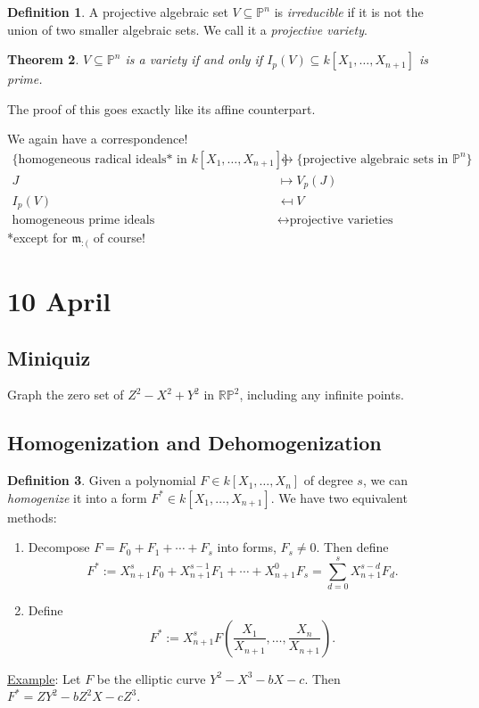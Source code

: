 \documentclass[12pt]{article}
\newcommand{\ita}[1]{\textit{#1}}
\newtheorem{theorem}{Theorem}[section]
\theoremstyle{definition}
\newtheorem{definition}[theorem]{Definition}
\begin{document}
\begin{definition}
    A projective algebraic set $V\subseteq\mathbb{P}^n$ is \ita{irreducible} if it is not the union of two smaller algebraic sets. We call it a \ita{projective variety}.
\end{definition}
\begin{theorem}
    $V\subseteq\mathbb{P}^n$ is a variety if and only if $I_p(V)\subseteq k[X_1,\dotsc,X_{n+1}]$ is prime.
\end{theorem}
The proof of this goes exactly like its affine counterpart.

We again have a correspondence!
\begin{equation}
    \begin{split}
        \{\text{homogeneous radical ideals* in }k[X_1,\dotsc,X_{n+1}]\}&\longleftrightarrow\{\text{projective algebraic sets in }\mathbb{P}^n\}\\
        J&\mapsto V_p(J)\\
        I_p(V)&\mapsfrom V\\
        \text{homogeneous prime ideals}&\longleftrightarrow\text{projective varieties}
    \end{split}
\end{equation}
*except for $\mathfrak{m}_{:(}$ of course!
\section{10 April}
\subsection{Miniquiz}
Graph the zero set of $Z^2-X^2+Y^2$ in $\mathbb{RP}^2$, including any infinite points.
\subsection{Homogenization and Dehomogenization}
\begin{definition}
    Given a polynomial $F\in k[X_1,\dotsc,X_n]$ of degree $s$, we can \ita{homogenize} it into a form $F^*\in k[X_1,\dotsc,X_{n+1}]$. We have two equivalent methods:
    \begin{enumerate}
        \item Decompose $F=F_0+F_1+\dotsb+F_s$ into forms, $F_s\neq0$. Then define 
        \begin{equation}
            F^*:=X_{n+1}^sF_0+X_{n+1}^{s-1}F_1+\dotsb+X_{n+1}^0F_s=\sum\limits_{d=0}^sX_{n+1}^{s-d}F_d.
        \end{equation}
        \item Define 
        \begin{equation}
            F^*:=X_{n+1}^sF\left(\frac{X_1}{X_{n+1}},\dotsc,\frac{X_n}{X_{n+1}}\right).
        \end{equation}
    \end{enumerate}
\end{definition}
\underline{Example}: Let $F$ be the elliptic curve $Y^2-X^3-bX-c$. Then $F^*=ZY^2-bZ^2X-cZ^3$.
\end{document}

